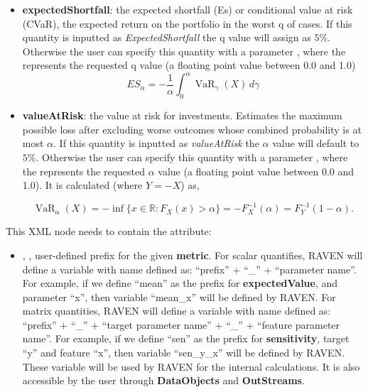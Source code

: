 \begin{itemize}
\begin{itemize}
  \item \textbf{expectedShortfall}: the expected shortfall (Es) or conditional value at risk (CVaR), the expected return on the portfolio in the worst q of cases. If this quantity is inputted as \textit{ExpectedShortfall} the q value will assign as $5\%$. Otherwise the user can specify this quantity with a parameter , where the  represents the requested q value (a floating point value between 0.0 and 1.0)
  \begin{equation}
    ES_\alpha = -\frac{1}{\alpha} \int_0^\alpha \operatorname{VaR}_\gamma(X) \, d\gamma
  \end{equation}
  \item \textbf{valueAtRisk}: the value at risk for investments. Estimates the maximum possible loss after excluding worse outcomes whose combined probability is at most $\alpha$. If this quantity is inputted as \textit{valueAtRisk} the $\alpha$ value will default to $5\%$. Otherwise the user can specify this quantity with a parameter , where the  represents the requested $\alpha$ value (a floating point value between 0.0 and 1.0). It is calculated (where $ Y = -X $) as,

  \begin{equation}
    \operatorname{VaR}_\alpha(X)=-\inf\big\{x\in\mathbb{R}:F_X(x)>\alpha\big\} = -F^{-1}_X(\alpha) = F^{-1}_Y(1-\alpha).
  \end{equation}
  \end{itemize}
  This XML node needs to contain the attribute:
  \begin{itemize}
    \itemsep0em
    \item {}, , user-defined prefix for the given \textbf{metric}.
      For scalar quantifies, RAVEN will define a variable with name defined as:  ``prefix'' + ``\_'' + ``parameter name''.
      For example, if we define ``mean'' as the prefix for \textbf{expectedValue}, and parameter ``x'', then variable
      ``mean\_x'' will be defined by RAVEN.
      For matrix quantities, RAVEN will define a variable with name defined as: ``prefix'' + ``\_'' + ``target parameter name'' + ``\_'' + ``feature parameter name''.
      For example, if we define ``sen'' as the prefix for \textbf{sensitivity}, target ``y'' and feature ``x'', then
      variable ``sen\_y\_x'' will be defined by RAVEN.
      \nb These variable will be used by RAVEN for the internal calculations. It is also accessible by the user through
      \textbf{DataObjects} and \textbf{OutStreams}.
  \end{itemize}

\end{itemize}


